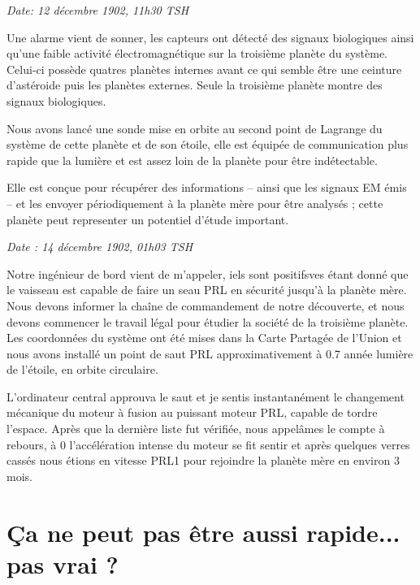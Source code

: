 \documentclass[12pt,colorlinks,a4paper]{book}
\renewcommand{\cdot}{\textperiodcentered}
\begin{document}
\textit{Date: 12 décembre 1902, 11h30 TSH}\par 
\bigskip

Une alarme vient de sonner, les capteurs ont détecté des signaux biologiques
ainsi qu'une faible activité électromagnétique sur la troisième planète
du système. Celui-ci possède quatres planètes internes avant ce qui
semble être une ceinture d'astéroide puis les planètes externes. Seule
la troisième planète montre des signaux biologiques.\par
\bigskip

Nous avons lancé une sonde mise en orbite au second point de Lagrange
du système de cette planète et de son étoile, elle est équipée de
communication plus rapide que la lumière et est assez loin de la planète
pour être indétectable.\par
\bigskip

Elle est conçue pour récupérer des informations -- ainsi que les
signaux EM émis -- et les envoyer périodiquement à la planète mère
pour être analysés ; cette planète peut representer un potentiel d'étude
important.\par
\bigskip

\textit{Date : 14 décembre 1902, 01h03 TSH}\par

Notre ingénieur de bord vient de m'appeler, iels sont positifs\cdot ves
étant donné que le vaisseau est capable de faire un seau PRL en sécurité
jusqu'à la planète mère. Nous devons informer la chaîne de commandement
de notre découverte, et nous devons commencer le travail légal pour
étudier la société de la troisième planète. Les coordonnées du système
ont été mises dans la Carte Partagée de l'Union et nous avons installé
un point de saut PRL approximativement à 0.7 année lumière de l'étoile,
en orbite circulaire.\par

\bigskip

L'ordinateur central approuva le saut et je sentis instantanément
le changement mécanique du moteur à fusion au puissant moteur PRL,
capable de tordre l'espace. Après que la dernière liste fut vérifiée,
nous appelâmes le compte à rebours, à 0 l'accélération intense du
moteur se fit sentir et après quelques verres cassés nous étions en
vitesse PRL1 pour rejoindre la planète mère en environ 3 mois.\par
\bigskip

\chapter{Ça ne peut pas être aussi rapide... pas vrai ?}
\end{document}
